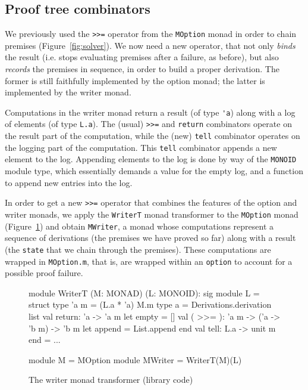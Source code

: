 \documentclass{easychair}
\def\li{\lstinline}
\newcommand{\fref}[1]{Figure~\ref{fig:#1}}
\begin{document}
\subsection{Proof tree combinators}

We previously used the \li+>>=+ operator from the \li+MOption+ monad in order to
chain premises (\fref{solver}). We now need a new operator, that not only
\emph{binds} the result (i.e. stops evaluating premises after a failure, as
before), but also \emph{records} the premises in sequence, in order to build a
proper derivation. The former is still faithfully implemented by the option
monad; the latter is implemented by the writer monad.

Computations in the writer monad return a result (of type \li+'a+) along with a log of
elements (of type \li+L.a+). The (usual) \li+>>=+ and \li+return+ combinators operate on
the result part of the computation, while the (new) \li+tell+ combinator
operates on the logging part of the computation. This \li+tell+ combinator
appends a new element to the log. Appending elements to the log is done by way of the \li+MONOID+
module type, which essentially demands a value for the empty log, and a function to
append new entries into the log.

In order to get a new \li+>>=+ operator that combines the features of
the option and writer monads, we apply the \li+WriterT+ monad transformer to the
\li+MOption+ monad (\fref{writer}) and obtain \li+MWriter+, a monad whose
computations represent a sequence of derivations (the premises we have proved so far)
along with a result (the \li+state+ that we chain through the premises). These
computations are wrapped in \li+MOption.m+, that is, are wrapped within an
\li+option+ to account for a possible proof failure.

\begin{figure}
  \centering
\begin{ocaml}
module WriterT (M: MONAD) (L: MONOID): sig      module L = struct
  type 'a m = (L.a * 'a) M.m                      type a = Derivations.derivation list
  val return: 'a -> 'a m                          let empty = []
  val ( >>= ): 'a m -> ('a -> 'b m) -> 'b m       let append = List.append
                                                end
  val tell: L.a -> unit m
end = ...

module M = MOption
module MWriter = WriterT(M)(L)
\end{ocaml}
  \caption{The writer monad transformer (library code)}
  \label{fig:writer}
\end{figure}
\end{document}
